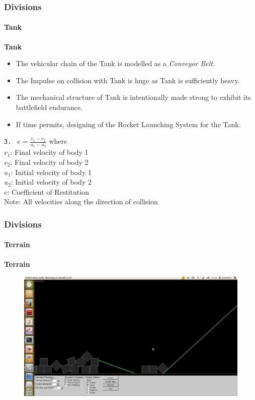 \begin{frame}
\frametitle{Divisions}
\framesubtitle{Tank}
  \textbf{Tank} \pause
  \begin{itemize}
    \item The vehicular chain of the Tank is modelled as a {\em Conveyor Belt}. \pause
    \item The Impulse on collision with Tank is huge as Tank is sufficiently heavy. \pause
    \item The mechanical structure of Tank is intentionally made strong to exhibit its battlefield endurance. \pause 
    \item If time permits, designing of the Rocket Launching System for the Tank. \pause
  \end{itemize}
 \texttt{3. } $ e = \frac{v_1 - v_2}{u_1 - u_2} $ \pause  where \\
  $ v_1 $: Final velocity of body 1 \\
  $ v_2 $: Final velocity of body 2 \\
  $ u_1 $: Initial velocity of body 1 \\
  $ u_2 $: Initial velocity of body 2 \\
  $ e $: Coefficient of Restitution \\
  \alert{Note:} All velocities along the direction of collision
\end{frame}

\begin{frame}
\frametitle{Divisions}
\framesubtitle{Terrain}
  \textbf{Terrain}
  \begin{figure}
  \includegraphics[width=.8\textwidth,center]{./Screenshots/terrain.png}
  \end{figure}
\end{frame}

